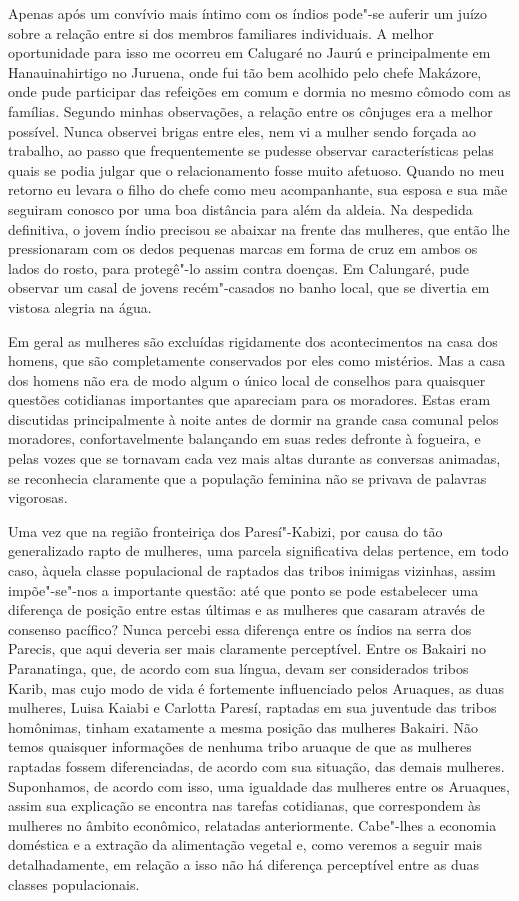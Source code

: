 {Apenas após um convívio mais íntimo com os índios pode"-se auferir um
juízo sobre a relação entre si dos membros familiares individuais. A
melhor oportunidade para isso me ocorreu em Calugaré no Jaurú e
principalmente em Hanauinahirtigo no Juruena, onde fui tão bem acolhido
pelo chefe Makázore, onde pude participar das refeições em comum e
dormia no mesmo cômodo com as famílias. Segundo minhas observações, a
relação entre os cônjuges era a melhor possível. Nunca observei brigas
entre eles, nem vi a mulher sendo forçada ao trabalho, ao
passo que frequentemente se pudesse observar características pelas
quais se podia julgar que o relacionamento fosse muito afetuoso. Quando
no meu retorno eu levara o filho do chefe como meu acompanhante, sua
esposa e sua mãe seguiram conosco por uma boa distância para além da
aldeia. Na despedida definitiva, o jovem índio precisou se abaixar na
frente das mulheres, que então lhe pressionaram com os dedos pequenas
marcas em forma de cruz em ambos os lados do rosto, para protegê"-lo
assim contra doenças. Em Calungaré, pude observar um casal de jovens
recém"-casados no banho local, que se divertia em vistosa alegria na
água.}

Em geral as mulheres são excluídas rigidamente dos acontecimentos na
casa dos homens, que são completamente conservados por eles como
mistérios. Mas a casa dos homens não era de modo algum o único local de
conselhos para quaisquer questões cotidianas importantes que apareciam
para os moradores. Estas eram discutidas principalmente à noite antes de
dormir na grande casa comunal pelos moradores, confortavelmente
balançando em suas redes defronte à fogueira, e pelas vozes que se
tornavam cada vez mais altas durante as conversas animadas, se
reconhecia claramente que a população feminina não se privava de
palavras vigorosas.

Uma vez que na região fronteiriça dos Paresí"-Kabizi, por causa do tão
generalizado rapto de mulheres, uma parcela significativa delas
pertence, em todo caso, àquela classe populacional de raptados das
tribos inimigas vizinhas, assim impõe"-se"-nos a importante questão: até
que ponto se pode estabelecer uma diferença de posição entre estas
últimas e as mulheres que casaram através de consenso pacífico? Nunca
percebi essa diferença entre os índios na serra dos Parecis, que aqui
deveria ser mais claramente perceptível. Entre os Bakairi no
Paranatinga, que, de acordo com sua língua, devam ser considerados
tribos Karib, mas cujo modo de vida é fortemente influenciado pelos
Aruaques, as duas mulheres, Luisa Kaiabi e Carlotta Paresí, raptadas em
sua juventude das tribos homônimas, tinham exatamente a mesma posição
das mulheres Bakairi. Não temos quaisquer informações de nenhuma tribo
aruaque de que as mulheres raptadas fossem diferenciadas, de acordo com
sua situação, das demais mulheres. Suponhamos, de acordo com isso, uma
igualdade das mulheres entre os Aruaques, assim sua explicação se
encontra nas tarefas cotidianas, que correspondem às mulheres no âmbito
econômico, relatadas anteriormente. Cabe"-lhes a economia doméstica e a
extração da alimentação vegetal e, como veremos a seguir mais
detalhadamente, em relação a isso não há diferença perceptível entre as
duas classes populacionais.

